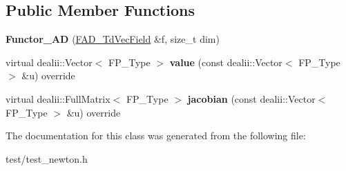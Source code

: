 \subsection*{Public Member Functions}
\begin{DoxyCompactItemize}
\item 
\mbox{\label{classFunctor__AD_a1067630ab8497d378b8a092518bab7c7}} 
{\bfseries Functor\+\_\+\+AD} (\hyperlink{structFAD__TdVecField}{F\+A\+D\+\_\+\+Td\+Vec\+Field} \&f, size\+\_\+t dim)
\item 
\mbox{\label{classFunctor__AD_aedeb5bf5de2993ba7b068a5a24a1445c}} 
virtual dealii\+::\+Vector$<$ F\+P\+\_\+\+Type $>$ {\bfseries value} (const dealii\+::\+Vector$<$ F\+P\+\_\+\+Type $>$ \&u) override
\item 
\mbox{\label{classFunctor__AD_ad5904619e14efbbdfb49052bc33d03e1}} 
virtual dealii\+::\+Full\+Matrix$<$ F\+P\+\_\+\+Type $>$ {\bfseries jacobian} (const dealii\+::\+Vector$<$ F\+P\+\_\+\+Type $>$ \&u) override
\end{DoxyCompactItemize}


The documentation for this class was generated from the following file\+:\begin{DoxyCompactItemize}
\item 
test/test\+\_\+newton.\+h\end{DoxyCompactItemize}

